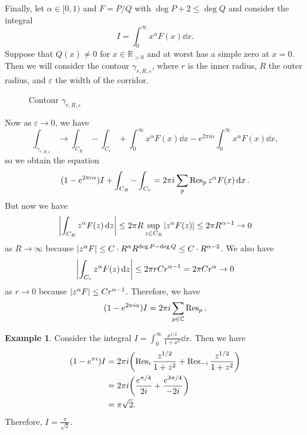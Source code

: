 \documentclass[leqno, openany]{memoir}
\theoremstyle{definition}
\newtheorem{exm}[thm]{Example}
\theoremstyle{remark}
\theoremstyle{plain}
\theoremstyle{definition}
\theoremstyle{remark}
\newcommand{\R}{\mathbb{R}}
\newcommand{\C}{\mathbb{C}}
\newcommand{\ep}{\varepsilon}
\begin{document}
Finally, let $\alpha \in [0,1)$ and $F = P/Q$ with $\deg P + 2 \leq \deg Q$ and consider the integral
\[ I = \int_0^{\infty} x^{\alpha} F(x) \dd{x}. \]
Suppose that $Q(x) \neq 0$ for $x \in \R_{>0}$ and at worst has a simple zero at $x = 0$. Then we will consider the contour $\gamma_{r,R, \ep}$, where $r$ is the inner radius, $R$ the outer radius, and $\ep$ the width of the corridor.
\begin{figure}[H]
\begin{center}
\end{center}
\caption{Contour $\gamma_{r,R,\ep}$}%
\label{fig:}
\end{figure}
Now as $\ep \to 0$, we have
\[ \int_{\gamma_{r,R,\ep}} \to \int_{C_R} - \int_{C_r} + \int_{0}^{\infty} x^{\alpha} F(x) \dd{x} - e^{2 \pi i \alpha} \int_0^{\infty} x^{\alpha} F(x) \dd{x}, \]
so we obtain the equation
\[ (1 - e^{2 \pi i \alpha})I + \int_{C_R} - \int_{C_r} = 2 \pi i \sum_p \Res_p z^{\alpha} F(x) \dd{x}. \]
But now we have
\[ \abs{\int_{C_R} z^{\alpha} F(z) \dd{z}} \leq 2 \pi R \sup_{z \in C_R} \abs{z^{\alpha} F(z)} \leq 2 \pi R^{\alpha - 1} \to 0 \]
as $R \to \infty$ because $\abs{z^{\alpha} F} \leq C \cdot R^{\alpha} R^{\deg P - \deg Q} \leq C \cdot R^{\alpha - 2}$. We also have
\[ \abs{\int_{C_r} z^{\alpha} F(z) \dd{z}} \leq 2 \pi r C r^{\alpha - 1} = 2 \pi C r^{\alpha} \to 0 \]
as $r \to 0$ because $\abs{z^{\alpha}F} \leq C r^{\alpha - 1}$. Therefore, we have
\[ (1 - e^{2 \pi i \alpha}) I = 2 \pi i \sum_{p \in \C} \Res_p. \]

\begin{exm}
    Consider the integral $I = \int_0^{\infty} \frac{x^{1/2}}{1 + x^2} \dd{x}$. Then we have
    \begin{align*}
        (1 - e^{\pi i}) I &= 2 \pi i \qty( \Res_i \frac{z^{1/2}}{1+z^2} + \Res_{-i} \frac{z^{1/2}}{1+z^2} ) \\
                          &= 2 \pi i \qty(\frac{e^{\pi/4}}{2i} + \frac{e^{3 \pi/4}}{-2i}) \\
                          &= \pi \sqrt{2}.
    \end{align*}
    Therefore, $I = \frac{\pi}{\sqrt{2}}$.
\end{exm}
\end{document}
